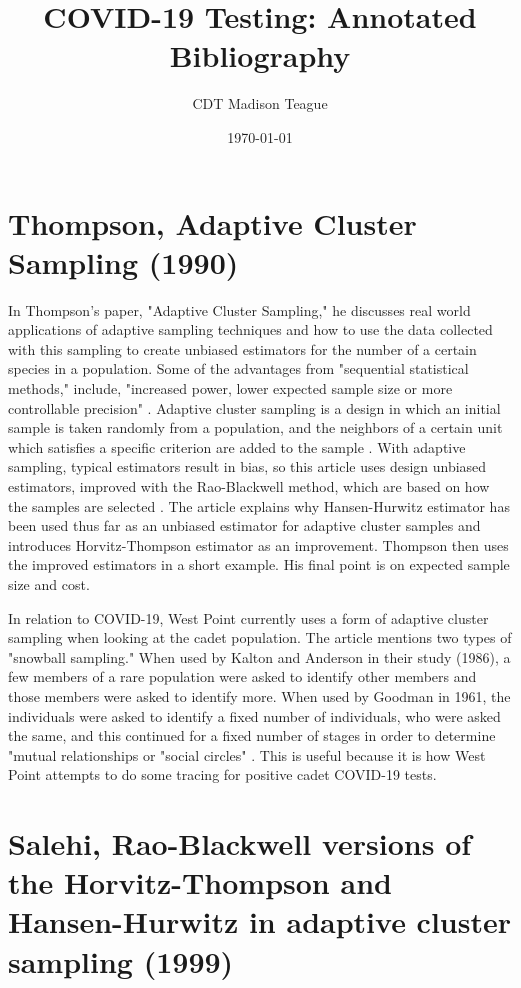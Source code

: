 \documentclass{article}
\title{COVID-19 Testing: Annotated Bibliography}
\author{CDT Madison Teague}
\date{\today}
\begin{document}
\maketitle

\section{Thompson, Adaptive Cluster Sampling (1990)}

In Thompson's paper, "Adaptive Cluster Sampling," he discusses real world applications of adaptive sampling techniques and how to use the data collected with this sampling to create unbiased estimators for the number of a certain species in a population. Some of the advantages from "sequential statistical methods," include, "increased power, lower expected sample size or more controllable precision" \cite{thompson1990adaptive}. Adaptive cluster sampling is a design in which an initial sample is taken randomly from a population, and the neighbors of a certain unit which satisfies a specific criterion are added to the sample \cite{thompson1990adaptive}. With adaptive sampling, typical estimators result in bias, so this article uses design unbiased estimators, improved with the Rao-Blackwell method, which are based on how the samples are selected \cite{thompson1990adaptive}. The article explains why Hansen-Hurwitz estimator has been used thus far as an unbiased estimator for adaptive cluster samples and introduces Horvitz-Thompson estimator as an improvement. Thompson then uses the improved estimators in a short example. His final point is on expected sample size and cost. 

In relation to COVID-19, West Point currently uses a form of adaptive cluster sampling when looking at the cadet population. The article mentions two types of "snowball sampling." When used by Kalton and Anderson in their study (1986), a few members of a rare population were asked to identify other members and those members were asked to identify more. When used by Goodman in 1961, the individuals were asked to identify a fixed number of individuals, who were asked the same, and this continued for a fixed number of stages in order to determine "mutual relationships or "social circles" \cite{thompson1990adaptive}. This is useful because it is how West Point attempts to do some tracing for positive cadet COVID-19 tests.

\section{Salehi, Rao-Blackwell versions of the Horvitz-Thompson and Hansen-Hurwitz in adaptive cluster sampling (1999)}
\end{document}

